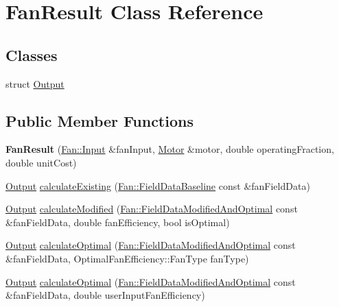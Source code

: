 \hypertarget{class_fan_result}{}\section{Fan\+Result Class Reference}
\label{class_fan_result}
\subsection*{Classes}
\begin{DoxyCompactItemize}
\item 
struct \hyperlink{struct_fan_result_1_1_output}{Output}
\end{DoxyCompactItemize}
\subsection*{Public Member Functions}
\begin{DoxyCompactItemize}
\item 
\mbox{\label{class_fan_result_a1ed5feb84f778969a28673c8e267e8c9}} 
{\bfseries Fan\+Result} (\hyperlink{struct_fan_1_1_input}{Fan\+::\+Input} \&fan\+Input, \hyperlink{struct_motor}{Motor} \&motor, double operating\+Fraction, double unit\+Cost)
\item 
\hyperlink{struct_fan_result_1_1_output}{Output} \hyperlink{class_fan_result_ad9bd0cc8f62fcb7bb7aca7eea511a2f3}{calculate\+Existing} (\hyperlink{struct_fan_1_1_field_data_baseline}{Fan\+::\+Field\+Data\+Baseline} const \&fan\+Field\+Data)
\item 
\hyperlink{struct_fan_result_1_1_output}{Output} \hyperlink{class_fan_result_a0c0a90d06749d599b48cf17aa06f0c67}{calculate\+Modified} (\hyperlink{struct_fan_1_1_field_data_modified_and_optimal}{Fan\+::\+Field\+Data\+Modified\+And\+Optimal} const \&fan\+Field\+Data, double fan\+Efficiency, bool is\+Optimal)
\item 
\hyperlink{struct_fan_result_1_1_output}{Output} \hyperlink{class_fan_result_af7b7c9891b6975f8ab78caf3441f60c0}{calculate\+Optimal} (\hyperlink{struct_fan_1_1_field_data_modified_and_optimal}{Fan\+::\+Field\+Data\+Modified\+And\+Optimal} const \&fan\+Field\+Data, Optimal\+Fan\+Efficiency\+::\+Fan\+Type fan\+Type)
\item 
\hyperlink{struct_fan_result_1_1_output}{Output} \hyperlink{class_fan_result_a477db4149cd45079cf03ef903ce7e2b8}{calculate\+Optimal} (\hyperlink{struct_fan_1_1_field_data_modified_and_optimal}{Fan\+::\+Field\+Data\+Modified\+And\+Optimal} const \&fan\+Field\+Data, double user\+Input\+Fan\+Efficiency)
\end{DoxyCompactItemize}


